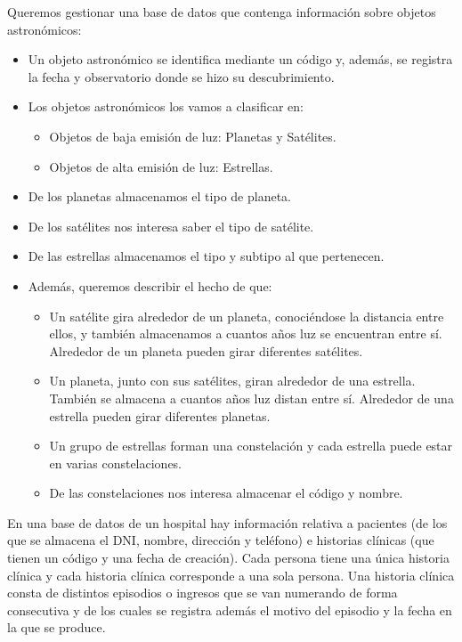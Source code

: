 \begin{ejercicio} \label{ej:13}
    Queremos gestionar una base de datos que contenga información sobre objetos astronómicos:
    \begin{itemize}
        \item Un objeto astronómico se identifica mediante un código y, además, se registra la fecha y observatorio
        donde se hizo su descubrimiento.
        \item Los objetos astronómicos los vamos a clasificar en:
        \begin{itemize}
            \item Objetos de baja emisión de luz: Planetas y Satélites.
            \item Objetos de alta emisión de luz: Estrellas.
        \end{itemize}
        \item De los planetas almacenamos el tipo de planeta.
        \item De los satélites nos interesa saber el tipo de satélite.
        \item De las estrellas almacenamos el tipo y subtipo al que pertenecen.
        \item Además, queremos describir el hecho de que:
        \begin{itemize}
            \item Un satélite gira alrededor de un planeta, conociéndose la distancia entre ellos, y también
            almacenamos a cuantos años luz se encuentran entre sí. Alrededor de un planeta pueden girar
            diferentes satélites.
            \item Un planeta, junto con sus satélites, giran alrededor de una estrella. También se almacena a
            cuantos años luz distan entre sí. Alrededor de una estrella pueden girar diferentes planetas.
            \item Un grupo de estrellas forman una constelación y cada estrella puede estar en varias
            constelaciones.
            \item De las constelaciones nos interesa almacenar el código y nombre.
        \end{itemize}
    \end{itemize}
\end{ejercicio}

\begin{ejercicio} \label{ej:14}
    En una base de datos de un hospital hay información relativa a pacientes (de los que se almacena el DNI,
    nombre, dirección y teléfono) e historias clínicas (que tienen un código y una fecha de creación). Cada
    persona tiene una única historia clínica y cada historia clínica corresponde a una sola persona. Una historia
    clínica consta de distintos episodios o ingresos que se van numerando de forma consecutiva y de los cuales
    se registra además el motivo del episodio y la fecha en la que se produce.
\end{ejercicio}

